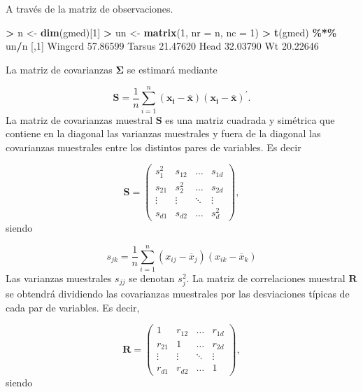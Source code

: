 \documentclass[
  a4paper,
  oneside]{scrbook}
\newenvironment{Shaded}{\begin{snugshade}}{\end{snugshade}}
\newcommand{\AttributeTok}[1]{\textcolor[rgb]{0.13,0.29,0.53}{#1}}
\newcommand{\DecValTok}[1]{\textcolor[rgb]{0.00,0.00,0.81}{#1}}
\newcommand{\FloatTok}[1]{\textcolor[rgb]{0.00,0.00,0.81}{#1}}
\newcommand{\FunctionTok}[1]{\textcolor[rgb]{0.13,0.29,0.53}{\textbf{#1}}}
\newcommand{\NormalTok}[1]{#1}
\newcommand{\OtherTok}[1]{\textcolor[rgb]{0.56,0.35,0.01}{#1}}
\newcommand{\SpecialCharTok}[1]{\textcolor[rgb]{0.81,0.36,0.00}{\textbf{#1}}}
\theoremstyle{definition}
\theoremstyle{definition}
\theoremstyle{definition}
\theoremstyle{definition}
\theoremstyle{remark}
\begin{document}
A través de la matriz de observaciones.

\footnotesize

\begin{Shaded}
\begin{Highlighting}[]
\SpecialCharTok{\textgreater{}}\NormalTok{ n }\OtherTok{\textless{}{-}} \FunctionTok{dim}\NormalTok{(gmed)[}\DecValTok{1}\NormalTok{]}
\SpecialCharTok{\textgreater{}}\NormalTok{ un }\OtherTok{\textless{}{-}} \FunctionTok{matrix}\NormalTok{(}\DecValTok{1}\NormalTok{, }\AttributeTok{nr =}\NormalTok{ n, }\AttributeTok{nc =} \DecValTok{1}\NormalTok{)}
\SpecialCharTok{\textgreater{}} \FunctionTok{t}\NormalTok{(gmed) }\SpecialCharTok{\%*\%}\NormalTok{ un}\SpecialCharTok{/}\NormalTok{n}
\NormalTok{            [,}\DecValTok{1}\NormalTok{]}
\NormalTok{Wingcrd }\FloatTok{57.86599}
\NormalTok{Tarsus  }\FloatTok{21.47620}
\NormalTok{Head    }\FloatTok{32.03790}
\NormalTok{Wt      }\FloatTok{20.22646}
\end{Highlighting}
\end{Shaded}

\normalsize

La matriz de covarianzas \(\bm\Sigma\) se estimará mediante

\[\bm{S}=\frac{1}{n}\sum_{i=1}^n\left(\bm{x_i}-\overline{\bm{x}}\right)\left(\bm{x_i}-\overline{\bm{x}}\right)^\prime{}.\]
La matriz de covarianzas muestral \(\bm{S}\) es una matriz cuadrada y
simétrica que contiene en la diagonal las varianzas muestrales y fuera
de la diagonal las covarianzas muestrales entre los distintos pares de
variables. Es decir

\[\bm{S}=\left(\begin{array}{cccc}s_1^2&s_{12}&\ldots&s_{1d}\\
s_{21}&s_{2}^2&\ldots&s_{2d}\\
\vdots&\vdots&\ddots&\vdots\\
s_{d1}&s_{d2}&\ldots&s_{d}^2\end{array}\right),\]
siendo

\[s_{jk}=\frac{1}{n}\sum_{i=1}^n(x_{ij}-\overline{x}_j)(x_{ik}-\overline{x}_k)\]
Las varianzas muestrales \(s_{jj}\) se denotan \(s_j^2\). La matriz de
correlaciones muestral \(\bm R\) se obtendrá dividiendo las covarianzas
muestrales por las desviaciones típicas de cada par de variables. Es
decir,

\[\bm{R}=\left(\begin{array}{cccc}1&r_{12}&\ldots&r_{1d}\\
r_{21}&1&\ldots&r_{2d}\\
\vdots&\vdots&\ddots&\vdots\\
r_{d1}&r_{d2}&\ldots&1\end{array}\right),\]
siendo
\end{document}
